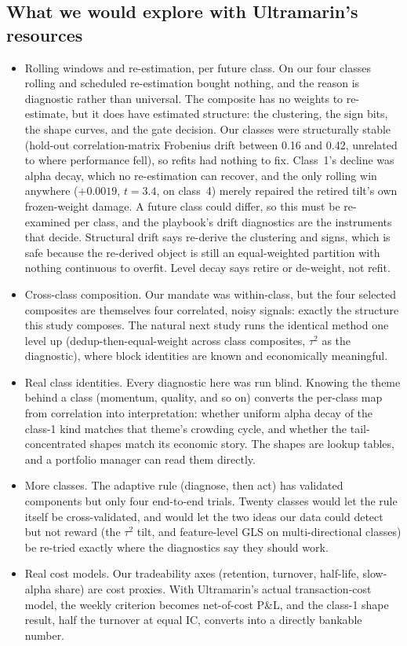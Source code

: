 \documentclass[11pt]{article}
\begin{document}
\subsection{What we would explore with Ultramarin's resources}
\label{sec:discussion-future}

\begin{itemize}
\item Rolling windows and re-estimation, per future class. On our four classes
      rolling and scheduled re-estimation bought nothing, and the reason is diagnostic
      rather than universal. The composite has no weights to re-estimate, but it does
      have estimated structure: the clustering, the sign bits, the shape curves, and the
      gate decision. Our classes were structurally stable (hold-out correlation-matrix
      Frobenius drift between 0.16 and 0.42, unrelated to where performance fell), so
      refits had nothing to fix. Class~1's decline was alpha decay, which no
      re-estimation can recover, and the only rolling win anywhere ($+0.0019$, $t=3.4$,
      on class~4) merely repaired the retired tilt's own frozen-weight damage. A future
      class could differ, so this must be re-examined per class, and the playbook's
      drift diagnostics are the instruments that decide. Structural drift says re-derive
      the clustering and signs, which is safe because the re-derived object is still an
      equal-weighted partition with nothing continuous to overfit. Level decay says
      retire or de-weight, not refit.
\item Cross-class composition. Our mandate was within-class, but the four selected
      composites are themselves four correlated, noisy signals: exactly the structure
      this study composes. The natural next study runs the identical method one level up
      (dedup-then-equal-weight across class composites, $\tau^2$ as the diagnostic),
      where block identities are known and economically meaningful.
\item Real class identities. Every diagnostic here was run blind. Knowing the theme
      behind a class (momentum, quality, and so on) converts the per-class map from
      correlation into interpretation: whether uniform alpha decay of the class-1 kind
      matches that theme's crowding cycle, and whether the tail-concentrated shapes
      match its economic story. The shapes are lookup tables, and a portfolio manager
      can read them directly.
\item More classes. The adaptive rule (diagnose, then act) has validated
      components but only four end-to-end trials. Twenty classes would let the rule
      itself be cross-validated, and would let the two ideas our data could detect but
      not reward (the $\tau^2$ tilt, and feature-level GLS on multi-directional classes)
      be re-tried exactly where the diagnostics say they should work.
\item Real cost models. Our tradeability axes (retention, turnover, half-life,
      slow-alpha share) are cost proxies. With Ultramarin's actual transaction-cost
      model, the weekly criterion becomes net-of-cost P\&L, and the class-1 shape
      result, half the turnover at equal IC, converts into a directly bankable number.
\end{itemize}
\end{document}
